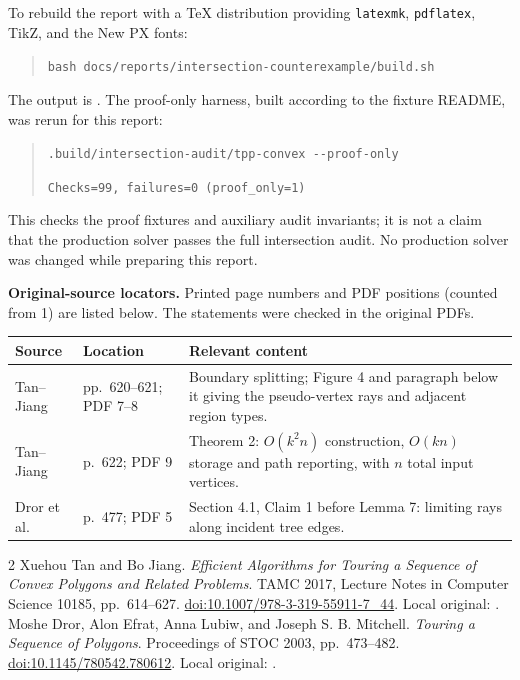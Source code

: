 \documentclass[11pt,a4paper]{article}
\begin{document}
To rebuild the report with a TeX distribution providing \texttt{latexmk},
\texttt{pdflatex}, TikZ, and the New PX fonts:
\begin{quote}\small
\verb|bash docs/reports/intersection-counterexample/build.sh|
\end{quote}
The output is .
The proof-only harness, built according to the fixture README, was rerun for
this report:
\begin{quote}\small
\verb|.build/intersection-audit/tpp-convex --proof-only|\par
\verb|Checks=99, failures=0 (proof_only=1)|
\end{quote}
This checks the proof fixtures and auxiliary audit invariants; it is not a
claim that the production solver passes the full intersection audit. No
production solver was changed while preparing this report.

\textbf{Original-source locators.} Printed page numbers and PDF positions
(counted from 1) are listed below. The statements were checked in the original PDFs.
\begin{center}
\small
\renewcommand{\arraystretch}{1.18}
\begin{tabular}{@{}p{}p{}p{}@{}}
\toprule
Source & Location & Relevant content\\
\midrule
Tan--Jiang & pp.~620--621; PDF 7--8 & Boundary splitting; Figure 4 and paragraph below it giving the pseudo-vertex rays and adjacent region types.\\
Tan--Jiang & p.~622; PDF 9 & Theorem 2: $O(k^2n)$ construction, $O(kn)$ storage and path reporting, with $n$ total input vertices.\\
Dror et al. & p.~477; PDF 5 & Section 4.1, Claim 1 before Lemma 7: limiting rays along incident tree edges.\\
\bottomrule
\end{tabular}
\end{center}

\begingroup
\small
\setlength{\parskip}{3pt}
\begin{thebibliography}{2}
 Xuehou Tan and Bo Jiang.
\emph{Efficient Algorithms for Touring a Sequence of Convex Polygons and Related
Problems}. TAMC 2017, Lecture Notes in Computer Science 10185, pp.~614--627.
\href{https://doi.org/10.1007/978-3-319-55911-7_44}{doi:10.1007/978-3-319-55911-7\_44}.
Local original: .
 Moshe Dror, Alon Efrat, Anna Lubiw, and Joseph S. B. Mitchell.
\emph{Touring a Sequence of Polygons}. Proceedings of STOC 2003, pp.~473--482.
\href{https://doi.org/10.1145/780542.780612}{doi:10.1145/780542.780612}.
Local original: .
\end{thebibliography}
\endgroup
\end{document}
